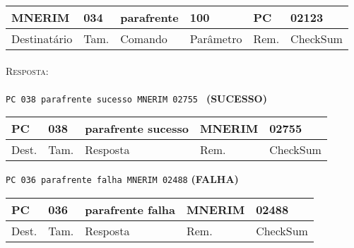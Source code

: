 \documentclass[11pt,	 papera4]{article}
\begin{document}
\begin{table}[h]
	\centering
	\begin{tabular}{p{2cm}p{1cm}p{2cm}p{2cm}p{1cm}p{2cm}}
		\toprule
		MNERIM & 034 & parafrente & 100 & PC & 02123 \\
		\midrule	
		Destinatário & Tam. & Comando & Parâmetro & Rem. & CheckSum \\
		\bottomrule
	\end{tabular}
	\label{tab:formatoslatex} %
\end{table}

\paragraph*{\newline\newline}
\hspace*{0.8cm}\textsc{Resposta:} \\\\ \hspace*{2cm}\texttt{PC 038 parafrente sucesso MNERIM 02755
} \hspace*{2cm}\textbf{(SUCESSO)}

\begin{table}[h]
	\centering
	\begin{tabular}{p{1cm}p{1cm}p{3.2cm}p{2cm}p{2cm}}
		\toprule
		PC & 038 &parafrente sucesso  & MNERIM & 02755 \\
		\midrule	
		Dest. & Tam. & Resposta & Rem. & CheckSum \\
		\bottomrule
	\end{tabular}
	\label{tab:formatoslatex} %
\end{table}

\hspace*{1.2cm} \texttt{PC 036 parafrente falha MNERIM 02488} \hspace*{2.5cm}\textbf{(FALHA)}

\begin{table}[h]
	\centering
	\begin{tabular}{p{1cm}p{1cm}p{3cm}p{2cm}p{2cm}}
		\toprule
		PC & 036 & parafrente falha  & MNERIM & 02488 \\
		\midrule	
		Dest. & Tam. & Resposta & Rem. & CheckSum \\
		\bottomrule
	\end{tabular}
	\label{tab:formatoslatex} %
\end{table}

\newpage
\end{document}
